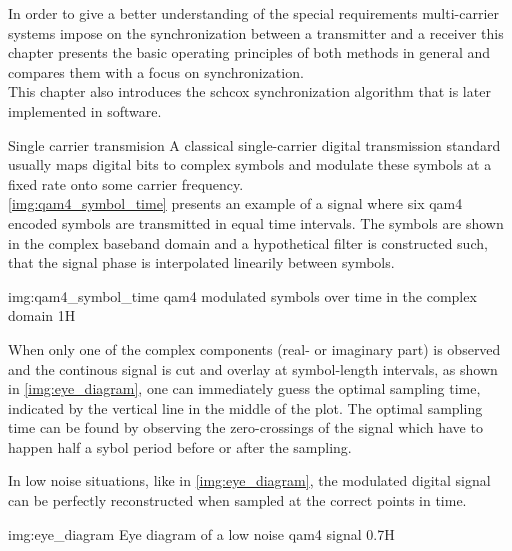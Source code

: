 In order to give a better understanding of the special
requirements multi-carrier systems impose on the
synchronization between a transmitter and a receiver
this chapter presents the basic operating principles
of both methods in general and compares them with
a focus on synchronization. \\

This chapter also introduces the \acrlong{schcox}
synchronization algorithm that is later implemented
in software.

\begin{subchapter}{Single carrier transmision}
  A classical single-carrier digital transmission standard
  usually maps digital bits to complex symbols and modulate these
  symbols at a fixed rate onto some carrier frequency. \\

  \autoref{img:qam4_symbol_time} presents an example of
  a signal where six \acrshort{qam4} encoded symbols
  are transmitted in equal time intervals.
  The symbols are shown in the complex baseband domain and a
  hypothetical filter is constructed such, that the signal
  phase is interpolated linearily between symbols.

               {img:qam4_symbol_time}
               {\acrshort{qam4} modulated symbols over time in the complex domain}
               {1}{H}

  When only one of the complex components (real- or imaginary part)
  is observed and the continous signal is cut and overlay at symbol-length
  intervals, as shown in \autoref{img:eye_diagram}, one can
  immediately guess the optimal sampling time, indicated by the
  vertical line in the middle of the plot.
  The optimal sampling time can be found by observing the
  zero-crossings of the signal which have to happen half a
  sybol period before or after the sampling.

  In low noise situations, like in \autoref{img:eye_diagram},
  the modulated digital signal can be perfectly reconstructed
  when sampled at the correct points in time.

                  {img:eye_diagram}
                  {Eye diagram of a low noise \acrshort{qam4} signal}
                  {0.7}{H}
\end{subchapter}


